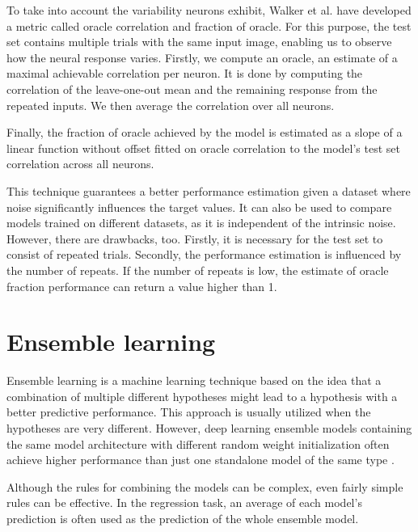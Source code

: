 To take into account the variability neurons exhibit, Walker et al. \citep{walker2019inception} have developed a metric called oracle correlation and fraction of oracle. For this purpose, the test set contains multiple trials with the same input image, enabling us to observe how the neural response varies. Firstly, we compute an oracle, an estimate of a maximal achievable correlation per neuron. It is done by computing the correlation of the leave-one-out mean and the remaining response from the repeated inputs. We then average the correlation over all neurons.

Finally, the fraction of oracle achieved by the model is estimated as a slope of a linear function without offset fitted on oracle correlation to the model's test set correlation across all neurons.

This technique guarantees a better performance estimation given a dataset where noise significantly influences the target values. It can also be used to compare models trained on different datasets, as it is independent of the intrinsic noise. However, there are drawbacks, too. Firstly, it is necessary for the test set to consist of repeated trials. Secondly, the performance estimation is influenced by the number of repeats. If the number of repeats is low, the estimate of oracle fraction performance can return a value higher than 1.


\section{Ensemble learning}

Ensemble learning is a machine learning technique based on the idea that a combination of multiple different hypotheses might lead to a hypothesis with a better predictive performance. This approach is usually utilized when the hypotheses are very different. However, deep learning ensemble models containing the same model architecture with different random weight initialization often achieve higher performance than just one standalone model of the same type \citep{fort2019deep}.

Although the rules for combining the models can be complex, even fairly simple rules can be effective. In the regression task, an average of each model’s prediction is often used as the prediction of the whole ensemble model.












